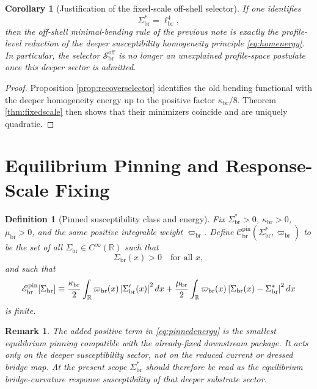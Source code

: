 \documentclass[11pt]{article}
\newcommand{\CurvScale}{\ell_{\mathrm{br}}}
\newcommand{\ProfWeight}{\varpi_{\mathrm{br}}}
\newcommand{\ProfRule}{\mathscr S_{\mathrm{br}}^{\mathrm{off}}}
\newcommand{\RespSus}{\Sigma_{\mathrm{br}}}
\newcommand{\RespSusEq}{\Sigma_{\mathrm{br}}^{\ast}}
\newcommand{\RespClass}{\mathscr C_{\mathrm{br}}}
\newcommand{\RespEnergyPin}{\mathscr E_{\mathrm{br}}^{\mathrm{pin}}}
\newcommand{\RespStiff}{\kappa_{\mathrm{br}}}
\newcommand{\RespPin}{\mu_{\mathrm{br}}}
\newtheorem{definition}{Definition}
\newtheorem{remark}{Remark}
\newtheorem{corollary}{Corollary}
\begin{document}
\begin{corollary}[Justification of the fixed-scale off-shell selector]
\label{cor:justifyselector}
If one identifies
\begin{equation}
\RespSusEq=\CurvScale^4,
\label{eq:lfromsigma}
\end{equation}
then the off-shell minimal-bending rule of the previous note is exactly the profile-level reduction of the deeper susceptibility homogeneity principle \eqref{eq:homenergy}. In particular, the selector \(\ProfRule\) is no longer an unexplained profile-space postulate once this deeper sector is admitted.
\end{corollary}

\begin{proof}
Proposition \ref{prop:recoverselector} identifies the old bending functional with the deeper homogeneity energy up to the positive factor \(\RespStiff/8\). Theorem \ref{thm:fixedscale} then shows that their minimizers coincide and are uniquely quadratic.
\end{proof}

\section{Equilibrium Pinning and Response-Scale Fixing}

\begin{definition}[Pinned susceptibility class and energy]
\label{def:pinned}
Fix \(\RespSusEq>0\), \(\RespStiff>0\), \(\RespPin>0\), and the same positive integrable weight \(\ProfWeight\). Define \(\RespClass^{\mathrm{pin}}(\RespSusEq,\ProfWeight)\) to be the set of all \(\RespSus\in C^\infty(\mathbb R)\) such that
\begin{equation}
\RespSus(x)>0\quad\text{for all }x,
\label{eq:pinnedclass}
\end{equation}
and such that
\begin{equation}
\RespEnergyPin[\RespSus]
\equiv
\frac{\RespStiff}{2}\int_{\mathbb R}\ProfWeight(x)\,\abs{\RespSus'(x)}^2\,dx
+
\frac{\RespPin}{2}\int_{\mathbb R}\ProfWeight(x)\,\abs{\RespSus(x)-\RespSusEq}^2\,dx
\label{eq:pinnedenergy}
\end{equation}
is finite.
\end{definition}

\begin{remark}
The added positive term in \eqref{eq:pinnedenergy} is the smallest equilibrium pinning compatible with the already-fixed downstream package. It acts only on the deeper susceptibility sector, not on the reduced current or dressed bridge map. At the present scope \(\RespSusEq\) should therefore be read as the equilibrium bridge-curvature response susceptibility of that deeper substrate sector.
\end{remark}
\end{document}
